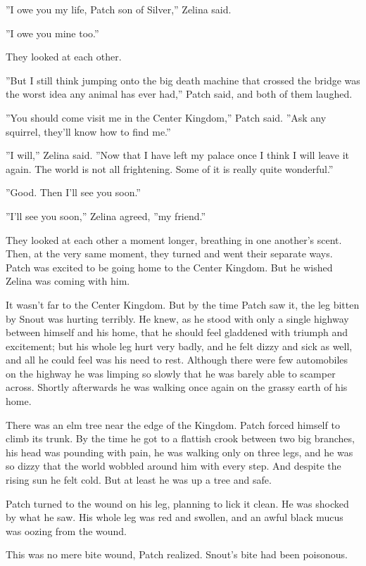 \documentclass[11pt]{article}
\begin{document}
 ''I owe you my life, Patch son of Silver,'' Zelina said.\par
 ''I owe you mine too.''\par
 They looked at each other.\par
 ''But I still think jumping onto the big death machine that crossed the bridge was the worst idea any animal has ever had,'' Patch said, and both of them laughed.\par
''You should come visit me in the Center Kingdom,'' Patch said. ''Ask any squirrel, they'll know how to find me.''\par
 ''I will,'' Zelina said. ''Now that I have left my palace once I think I will leave it again. The world is not all frightening. Some of it is really quite wonderful.''\par
 ''Good. Then I'll see you soon.''\par
 ''I'll see you soon,'' Zelina agreed, ''my friend.''\par
 They looked at each other a moment longer, breathing in one another's scent. Then, at the very same moment, they turned and went their separate ways. Patch was excited to be going home to the Center Kingdom. But he wished Zelina was coming with him.\par
 It wasn't far to the Center Kingdom. But by the time Patch saw it, the leg bitten by Snout was hurting terribly. He knew, as he stood with only a single highway between himself and his home, that he should feel gladdened with triumph and excitement; but his whole leg hurt very badly, and he felt dizzy and sick as well, and all he could feel was his need to rest. Although there were few automobiles on the highway he was limping so slowly that he was barely able to scamper across. Shortly afterwards he was walking once again on the grassy earth of his home.\par
 There was an elm tree near the edge of the Kingdom. Patch forced himself to climb its trunk. By the time he got to a flattish crook between two big branches, his head was pounding with pain, he was walking only on three legs, and he was so dizzy that the world wobbled around him with every step. And despite the rising sun he felt cold. But at least he was up a tree and safe.\par
Patch turned to the wound on his leg, planning to lick it clean. He was shocked by what he saw. His whole leg was red and swollen, and an awful black mucus was oozing from the wound.\par
 This was no mere bite wound, Patch realized. Snout's bite had been poisonous.\par
\end{document}
